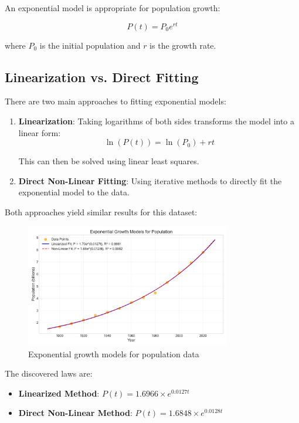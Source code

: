 \documentclass[12pt]{article}
\begin{document}
An exponential model is appropriate for population growth:

\begin{equation}
P(t) = P_0 e^{rt}
\end{equation}

where $P_0$ is the initial population and $r$ is the growth rate.

\subsection{Linearization vs. Direct Fitting}

There are two main approaches to fitting exponential models:

\begin{enumerate}
    \item \textbf{Linearization}: Taking logarithms of both sides transforms the model into a linear form:
    \begin{equation}
    \ln(P(t)) = \ln(P_0) + rt
    \end{equation}
    
    This can then be solved using linear least squares.

    \item \textbf{Direct Non-Linear Fitting}: Using iterative methods to directly fit the exponential model to the data.
\end{enumerate}

Both approaches yield similar results for this dataset:

\begin{figure}[H]
\centering
\includegraphics[width=0.8\textwidth]{population_growth.png}
\caption{Exponential growth models for population data}
\label{fig:population_growth}
\end{figure}

The discovered laws are:
\begin{itemize}
    \item \textbf{Linearized Method}: $P(t) = 1.6966 \times e^{0.0127t}$
    \item \textbf{Direct Non-Linear Method}: $P(t) = 1.6848 \times e^{0.0128t}$
\end{itemize}
\end{document}
